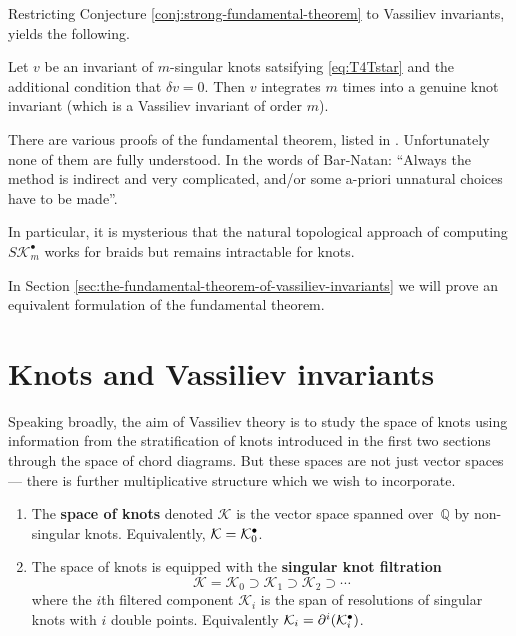 Restricting Conjecture \ref{conj:strong-fundamental-theorem} to Vassiliev invariants, yields the following.
\begin{theorem}
	\label{thm:fundamental-theorem-of-vassiliev-invariants}
	Let \(v\) be an invariant of \(m\)-singular knots satsifying \textup{\ref{eq:T4Tstar}} and the additional condition that \(\delta v = 0\). Then \(v\) integrates \(m\) times into a genuine knot invariant (which is a Vassiliev invariant of order \(m\)).
\end{theorem}


\begin{remark}
	There are various proofs of the fundamental theorem, listed in \cite{the-fundamental-theorem-of-vassiliev-invariants}. Unfortunately none of them are fully understood. In the words of Bar-Natan: ``Always the method is indirect and very complicated, and/or some a-priori unnatural choices have to be made''.

	In particular, it is mysterious that the natural topological approach of computing \(S\mathcal{K}^{\bullet}_{m}\) works for braids but remains intractable for knots.
\end{remark}

In Section \ref{sec:the-fundamental-theorem-of-vassiliev-invariants} we will prove an equivalent formulation of the fundamental theorem.

\section{Knots and Vassiliev invariants}
\label{sec:knots-and-vassiliev-invariants}

Speaking broadly, the aim of Vassiliev theory is to study the space of knots using information from the stratification of knots introduced in the first two sections through the space of chord diagrams.
But these spaces are not just vector spaces --- there is further multiplicative structure which we wish to incorporate.

\begin{definitions}
	\begin{enumerate}
	\item The \textbf{space of knots} denoted \(\mathcal{K}\) is the vector space spanned over~\(\mathbb{Q}\) by non-singular knots. Equivalently, \(\mathcal{K} = \mathcal{K}^{\bullet}_{0}\).
		\item The space of knots is equipped with the \textbf{singular knot filtration}
			\[\mathcal{K} = \mathcal{K}_{0} \supset \mathcal{K}_{1} \supset \mathcal{K}_{2} \supset \cdots\]
			where the \(i\)th filtered component \(\mathcal{K}_{i}\) is the span of resolutions of singular knots with \(i\) double points. Equivalently \(\mathcal{K}_{i} = \partial^{i}(\mathcal{K}^{\bullet}_{i})\).
	\end{enumerate}
\end{definitions}

